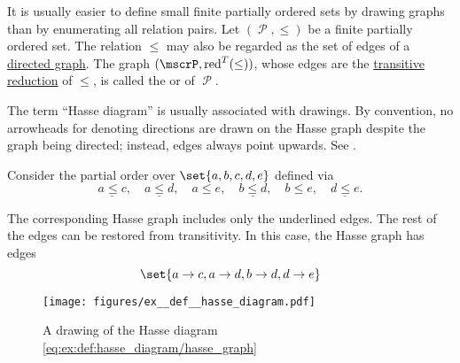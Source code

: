 \begin{definition}\label{def:hasse_diagram}
  It is usually easier to define small finite partially ordered sets by drawing graphs than by enumerating all relation pairs. Let \( (\mscrP, \leq) \) be a finite partially ordered set. The relation \( \leq \) may also be regarded as the set of edges of a \hyperref[def:directed_graph]{directed graph}. The graph \( (\mscrP, \red^T(\leq)) \), whose edges are the \hyperref[def:derived_relations/transitive]{transitive reduction} of \( \leq \), is called the  or  of \( \mscrP \).

  The term \enquote{Hasse diagram} is usually associated with drawings. By convention, no arrowheads for denoting directions are drawn on the Hasse graph despite the graph being directed; instead, edges always point upwards. See .
\end{definition}

\begin{example}\label{ex:def:hasse_diagram}
  Consider the partial order over \( \set{ a, b, c, d, e } \) defined via
  \begin{equation}\label{eq:ex:def:hasse_diagram/partially ordered set}
    \underline{a \leq c},\quad \underline{a \leq d},\quad a \leq e,\quad \underline{b \leq d},\quad b \leq e,\quad \underline{d \leq e}.
  \end{equation}

  The corresponding Hasse graph includes only the underlined edges. The rest of the edges can be restored from transitivity. In this case, the Hasse graph has edges
  \begin{equation}\label{eq:ex:def:hasse_diagram/hasse_graph}
    \set{ a \to c, a \to d, b \to d, d \to e }
  \end{equation}

  \begin{figure}
    \centering
    \texttt{[image: figures/ex\_\_def\_\_hasse\_diagram.pdf]}
    \caption{A drawing of the Hasse diagram \eqref{eq:ex:def:hasse_diagram/hasse_graph}}
    \label{fig:ex:def:hasse_diagram}
  \end{figure}
\end{example}

